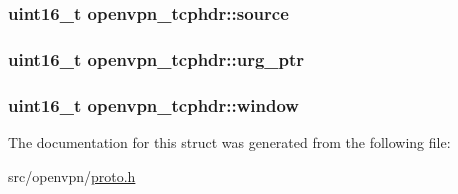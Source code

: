 \subsubsection[{source}]{\setlength{\rightskip}{0pt plus 5cm}uint16\+\_\+t openvpn\+\_\+tcphdr\+::source}\label{structopenvpn__tcphdr_a0664596f4310450226d641795a4cccaf}
\hypertarget{structopenvpn__tcphdr_a8a2190658a24123c97b86761d12dcdbe}{}
\subsubsection[{urg\+\_\+ptr}]{\setlength{\rightskip}{0pt plus 5cm}uint16\+\_\+t openvpn\+\_\+tcphdr\+::urg\+\_\+ptr}\label{structopenvpn__tcphdr_a8a2190658a24123c97b86761d12dcdbe}
\hypertarget{structopenvpn__tcphdr_a45d868503d531a6a7febdd4677955607}{}
\subsubsection[{window}]{\setlength{\rightskip}{0pt plus 5cm}uint16\+\_\+t openvpn\+\_\+tcphdr\+::window}\label{structopenvpn__tcphdr_a45d868503d531a6a7febdd4677955607}


The documentation for this struct was generated from the following file\+:\begin{DoxyCompactItemize}
\item 
src/openvpn/\hyperlink{proto_8h}{proto.\+h}\end{DoxyCompactItemize}
